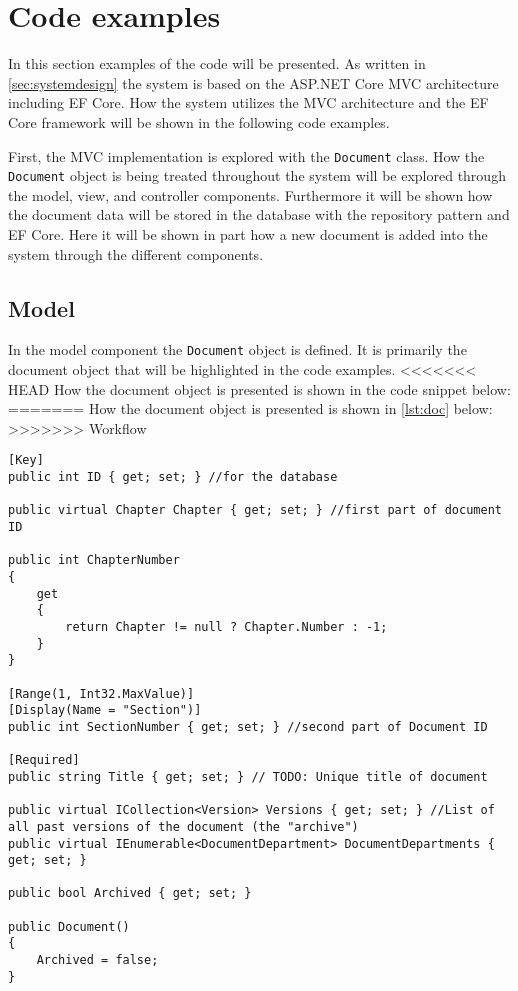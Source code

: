 \section{Code examples}\label{sec:codeexamples}
In this section examples of the code will be presented.
As written in \cref{sec:systemdesign} the system is based on the ASP.NET Core MVC architecture including EF Core.
How the system utilizes the MVC architecture and the EF Core framework will be shown in the following code examples.

First, the MVC implementation is explored with the \texttt{Document} class.
How the \texttt{Document} object is being treated throughout the system will be explored through the model, view, and controller components.
Furthermore it will be shown how the document data will be stored in the database with the repository pattern and EF Core.
Here it will be shown in part how a new document is added into the system through the different components.


\subsection{Model}

In the model component the \texttt{Document} object is defined.
It is primarily the document object that will be highlighted in the code examples.
<<<<<<< HEAD
How the document object is presented is shown in the code snippet below:
=======
How the document object is presented is shown in \cref{lst:doc} below:
>>>>>>> Workflow

\begin{lstlisting}[caption={Document Model: Document object}, label={lst:doc}]
[Key]
public int ID { get; set; } //for the database

public virtual Chapter Chapter { get; set; } //first part of document ID

public int ChapterNumber
{
	get
	{
		return Chapter != null ? Chapter.Number : -1;
	}
}

[Range(1, Int32.MaxValue)]
[Display(Name = "Section")]
public int SectionNumber { get; set; } //second part of Document ID

[Required]
public string Title { get; set; } // TODO: Unique title of document

public virtual ICollection<Version> Versions { get; set; } //List of all past versions of the document (the "archive")
public virtual IEnumerable<DocumentDepartment> DocumentDepartments { get; set; }

public bool Archived { get; set; }

public Document()
{
	Archived = false;
}
\end{lstlisting}

